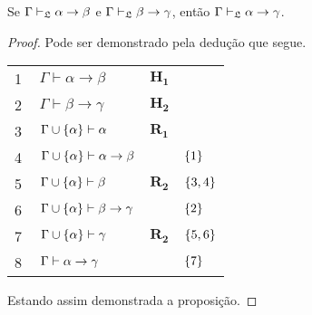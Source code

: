     \vspace{\baselineskip}
    \begin{tcolorbox}[enhanced jigsaw, breakable, sharp corners, colframe=black, colback=white, boxrule=0.5pt, left=1.5mm, right=1.5mm, top=1.5mm, bottom=1.5mm]
    \begin{lemma}[Composição]\label{composition}
        Se $\Gamma\mathrel{\vdash}_{\mathfrak{L}}\alpha\to\beta$ e $\Gamma\mathrel{\vdash}_{\mathfrak{L}}\beta\to\gamma$, então $\Gamma\mathrel{\vdash}_{\mathfrak{L}}\alpha\to\gamma$.
        \begin{proof}
            Pode ser demonstrado pela dedução que segue.

            \vspace{0.5\baselineskip}
            \footnotesize
            \setlength{\rowskip}{0.5\baselineskip}
            \begin{xltabular}{\textwidth}{r | X l l}
                \scriptsize{\phantom{0}1}\phantom{ } & $\ \Gamma\vdash\alpha\to\beta$                   & $\mathbf{H_1}$\phantom{1}                & \\[\rowskip]
                \scriptsize{\phantom{0}2}\phantom{ } & $\ \Gamma\vdash\beta\to\gamma$                   & $\mathbf{H_2}$                           & \\[\rowskip]
                \scriptsize{\phantom{0}3}\phantom{ } & $\ \Gamma\cup\set{\alpha}\entails\alpha$         & $\hyperref[modal.rule.1]{\mathbf{R_1}}$  & \\[\rowskip]
                \scriptsize{\phantom{0}4}\phantom{ } & $\ \Gamma\cup\set{\alpha}\entails\alpha\to\beta$ &                      & $\left\{1\right\}$\\[\rowskip]
                \scriptsize{\phantom{0}5}\phantom{ } & $\ \Gamma\cup\set{\alpha}\entails\beta$          & $\hyperref[modal.rule.2]{\mathbf{R_2}}$  & $\left\{3,4\right\}$\\
                \scriptsize{\phantom{0}6}\phantom{ } & $\ \Gamma\cup\set{\alpha}\entails\beta\to\gamma$ &                      & $\left\{2\right\}$\\[\rowskip]
                \scriptsize{\phantom{0}7}\phantom{ } & $\ \Gamma\cup\set{\alpha}\entails\gamma$         & $\hyperref[modal.rule.2]{\mathbf{R_2}}$  & $\left\{5,6\right\}$\\[\rowskip]
                \scriptsize{\phantom{0}8}\phantom{ } & $\ \Gamma\entails\alpha\to\gamma$                &                      & $\left\{7\right\}$
            \end{xltabular}
            \normalsize

            \vspace{.5\baselineskip}
            Estando assim demonstrada a proposição.
        \end{proof}
    \end{lemma}
    \end{tcolorbox}

